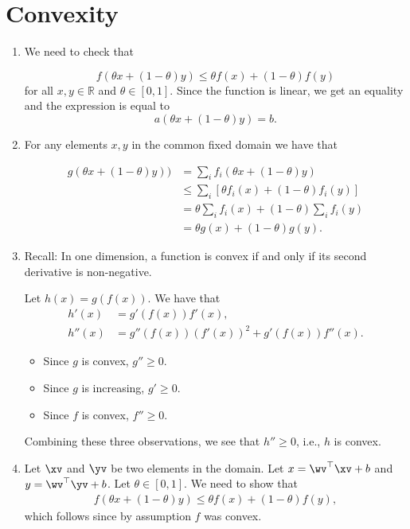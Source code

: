 \documentclass{../../tex_import/ETHuebung_english_theory}
\renewcommand{\R}{\mathbb{R}}
\begin{document}

\section{Convexity}

\begin{enumerate}
	\item We need to check that 

\[	f(\theta x+(1-\theta) y) \leq \theta f(x) + (1-\theta) f(y)	\]
for all $x, y \in \R$ and $\theta \in [0, 1]$. Since the function is linear, we get an equality and
the expression is equal to
\[	a(\theta x + (1-\theta) y) = b.	\]
	\item For any elements $x, y$ in the common fixed domain we have that

\begin{align*}
g(\theta x + (1-\theta) y)) 	&= \sum_i f_i(\theta x + (1-\theta) y)	\\
														&\leq  \sum_i [\theta f_i(x) + (1-\theta) f_i(y)] \\
														&=  \theta \sum_i f_i(x) + (1-\theta) \sum_i f_i(y) \\
														&= \theta g(x) + (1-\theta) g(y).
\end{align*}

	\item Recall: In one dimension, a function is convex if and only if its second derivative is non-negative.
	
	Let $h(x)=g(f(x))$. We have that
	\begin{align*}
	h'(x) &= g'(f(x))f'(x), \\
	h''(x) &= g''(f(x))(f'(x))^2 + g'(f(x))f''(x).
	\end{align*}
	
	\begin{itemize}
		\item Since $g$ is convex, $g'' \geq 0$.
		\item Since $g$ is increasing, $g' \geq 0$.
		\item Since $f$ is convex, $f'' \geq 0$.
	\end{itemize}
	Combining these three observations, we see that $h''\geq 0$, i.e., $h$ is convex.
	
	\item Let $\xv$ and $\yv$ be two elements in the domain.
	Let $x=\wv^\top \xv +b$ and $y=\wv^\top \yv +b$.  Let $\theta \in
	[0, 1]$. We need to show that
	\begin{align*}
	f(\theta x + (1-\theta) y) \leq \theta f(x) + (1-\theta) f(y),
	\end{align*}
	which follows since by assumption $f$ was convex.
	

\end{enumerate}
\end{document}
